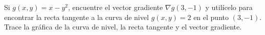 \item Si $g(x, y) = x - y^2$, encuentre el vector gradiente $\nabla g(3, -1)$ y utilícelo para encontrar la recta tangente a la curva de nivel $g(x, y) = 2$ en el punto $(3, -1)$. Trace la gráfica de la curva de nivel, la recta tangente y el vector gradiente.
